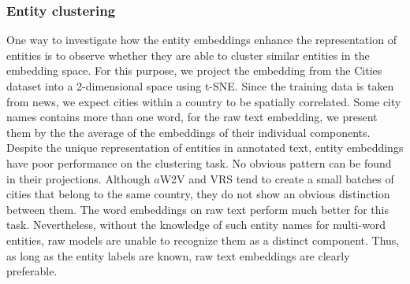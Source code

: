 \subsubsection{Entity clustering} 
One way to investigate how the entity embeddings enhance the representation of entities is to observe whether they are able to cluster similar entities in the embedding space. For this purpose, we project the embedding from the Cities dataset into a 2-dimensional space using t-SNE. Since the training data is taken from news, we expect cities within a country to be spatially correlated. Some city names contains more than one word, for the raw text embedding, we present them by the the average of the embeddings of their individual components. Despite the unique representation of entities in annotated text, entity embeddings have poor performance on the clustering task. No obvious pattern can be found in their projections. Although $a$W2V and VRS tend to create a small batches of cities that belong to the same country, they do not show an obvious distinction between them. The word embeddings on raw text perform much better for this task. Nevertheless, without the knowledge of such entity names for multi-word entities, raw models are unable to recognize them as a distinct component. Thus, as long as the entity labels are known, raw text embeddings are clearly preferable. 

